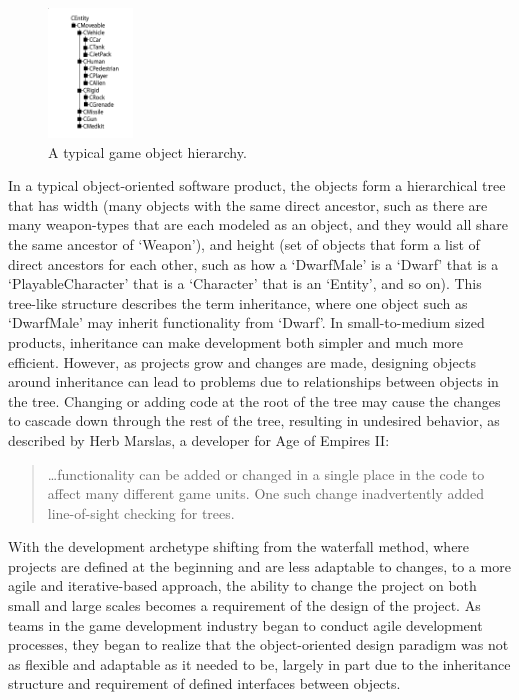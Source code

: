 \begin{figure}[!h]
  \centering \includegraphics[width=0.2\textwidth]{Images/tree}
  \caption{A typical game object hierarchy. \cite{west2006evolve}}
\end{figure}

In a typical object-oriented software product, the objects form a hierarchical tree that has width (many objects with the same direct ancestor, such as there are many weapon-types that are each modeled as an object, and they would all share the same ancestor of `Weapon'), and height (set of objects that form a list of direct ancestors for each other, such as how a `DwarfMale' is a `Dwarf' that is a `PlayableCharacter' that is a `Character' that is an `Entity', and so on). This tree-like structure describes the term inheritance, where one object such as `DwarfMale' may inherit functionality from `Dwarf'. In small-to-medium sized products, inheritance can make development both simpler and much more efficient. However, as projects grow and changes are made, designing objects around inheritance can lead to problems due to relationships between objects in the tree. Changing or adding code at the root of the tree may cause the changes to cascade down through the rest of the tree, resulting in undesired behavior, as described by Herb Marslas, a developer for Age of Empires II:

\begin{quote}
\ldots functionality can be added or changed in a single place in the code to affect many different game units. One such change inadvertently added line-of-sight checking for trees\cite{wilson2003game}.
\end{quote}

With the development archetype shifting from the waterfall method, where projects are defined at the beginning and are less adaptable to changes, to a more agile and iterative-based approach, the ability to change the project on both small and large scales becomes a requirement of the design of the project. As teams in the game development industry began to conduct agile development processes, they began to realize that the object-oriented design paradigm was not as flexible and adaptable as it needed to be, largely in part due to the inheritance structure and requirement of defined interfaces between objects.

